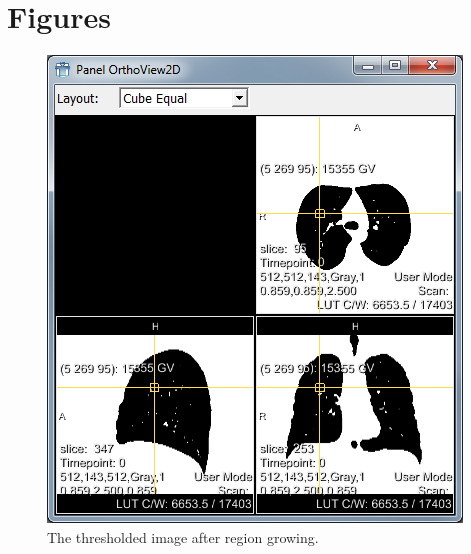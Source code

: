 \documentclass[a4paper,10pt]{article}
\numberwithin{equation}{section} %
\numberwithin{figure}{section} %
\numberwithin{table}{section} %
\begin{document}
\section{Figures}
\begin{figure}[h]
	\centering
	\includegraphics[scale=0.7]{regiongrowing}
    \caption{The thresholded image after region growing.}
    \label{fig:reg-gro}
\end{figure}
\end{document}
